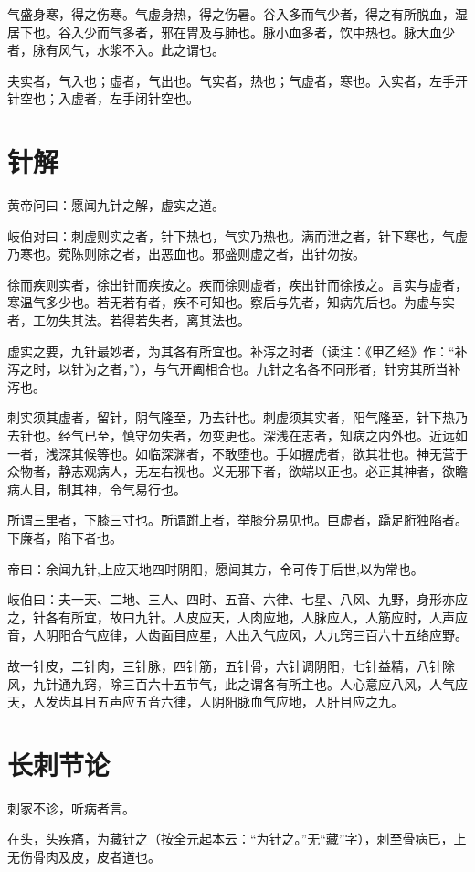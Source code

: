 \documentclass{article}%
\begin{document}
气盛身寒，得之伤寒。气虚身热，得之伤暑。谷入多而气少者，得之有所脱血，湿居下也。谷入少而气多者，邪在胃及与肺也。脉小血多者，饮中热也。脉大血少者，脉有风气，水浆不入。此之谓也。

夫实者，气入也；虚者，气出也。气实者，热也；气虚者，寒也。入实者，左手开针空也；入虚者，左手闭针空也。
\section{针解}
黄帝问曰：愿闻九针之解，虚实之道。

岐伯对曰：刺虚则实之者，针下热也，气实乃热也。满而泄之者，针下寒也，气虚乃寒也。菀陈则除之者，出恶血也。邪盛则虚之者，出针勿按。

徐而疾则实者，徐出针而疾按之。疾而徐则虚者，疾出针而徐按之。言实与虚者，寒温气多少也。若无若有者，疾不可知也。察后与先者，知病先后也。为虚与实者，工勿失其法。若得若失者，离其法也。

虚实之要，九针最妙者，为其各有所宜也。补泻之时者（读注：《甲乙经》作：“补泻之时，以针为之者，”），与气开阖相合也。九针之名各不同形者，针穷其所当补泻也。

刺实须其虚者，留针，阴气隆至，乃去针也。刺虚须其实者，阳气隆至，针下热乃去针也。经气已至，慎守勿失者，勿变更也。深浅在志者，知病之内外也。近远如一者，浅深其候等也。如临深渊者，不敢堕也。手如握虎者，欲其壮也。神无营于众物者，静志观病人，无左右视也。义无邪下者，欲端以正也。必正其神者，欲瞻病人目，制其神，令气易行也。

所谓三里者，下膝三寸也。所谓跗上者，举膝分易见也。巨虚者，蹻足胻独陷者。下廉者，陷下者也。

帝曰：余闻九针,上应天地四时阴阳，愿闻其方，令可传于后世,以为常也。

岐伯曰：夫一天、二地、三人、四时、五音、六律、七星、八风、九野，身形亦应之，针各有所宜，故曰九针。人皮应天，人肉应地，人脉应人，人筋应时，人声应音，人阴阳合气应律，人齿面目应星，人出入气应风，人九窍三百六十五络应野。

故一针皮，二针肉，三针脉，四针筋，五针骨，六针调阴阳，七针益精，八针除风，九针通九窍，除三百六十五节气，此之谓各有所主也。人心意应八风，人气应天，人发齿耳目五声应五音六律，人阴阳脉血气应地，人肝目应之九。
\section{长刺节论}
刺家不诊，听病者言。

在头，头疾痛，为藏针之（按全元起本云：“为针之。”无“藏”字），刺至骨病已，上无伤骨肉及皮，皮者道也。
\end{document}
